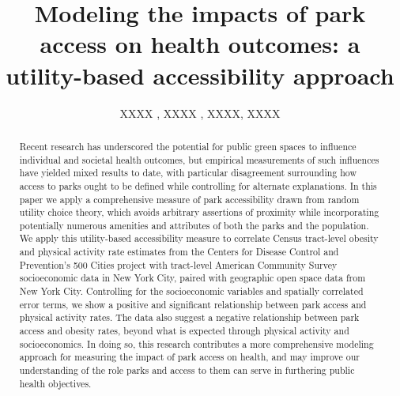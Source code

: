 \documentclass[Afour,sageh.bst]{sagej}
\begin{document}
\title{Modeling the impacts of park access on health outcomes: a utility-based
accessibility approach}


\author{XXXX , XXXX , XXXX, XXXX}




\begin{abstract}
Recent research has underscored the potential for public green spaces to
influence individual and societal health outcomes, but empirical
measurements of such influences have yielded mixed results to date, with
particular disagreement surrounding how access to parks ought to be
defined while controlling for alternate explanations. In this paper we
apply a comprehensive measure of park accessibility drawn from random
utility choice theory, which avoids arbitrary assertions of proximity
while incorporating potentially numerous amenities and attributes of
both the parks and the population. We apply this utility-based
accessibility measure to correlate Census tract-level obesity and
physical activity rate estimates from the Centers for Disease Control
and Prevention's 500 Cities project with tract-level American Community
Survey socioeconomic data in New York City, paired with geographic open
space data from New York City. Controlling for the socioeconomic
variables and spatially correlated error terms, we show a positive and
significant relationship between park access and physical activity
rates. The data also suggest a negative relationship between park access
and obesity rates, beyond what is expected through physical activity and
socioeconomics. In doing so, this research contributes a more
comprehensive modeling approach for measuring the impact of park access
on health, and may improve our understanding of the role parks and
access to them can serve in furthering public health objectives.
\end{abstract}


\maketitle
\end{document}

